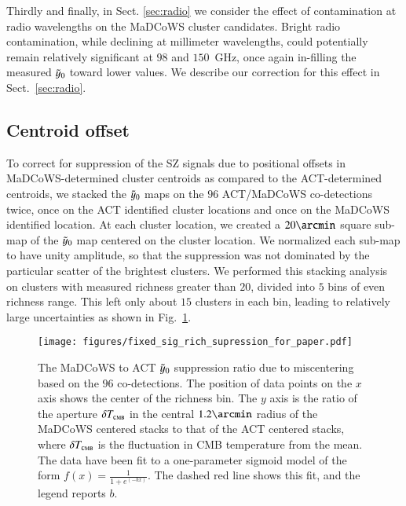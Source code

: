 \documentclass[longauth]{aa} %
\newcommand{\yc}{$\Tilde{\vary}_0$\xspace}
\begin{document}
Thirdly and finally, in Sect. \ref{sec:radio} we consider the effect of contamination at radio wavelengths on the MaDCoWS cluster candidates.  Bright radio contamination, while declining at millimeter wavelengths, could potentially remain relatively significant at $98$ and $150$~GHz,  once again in-filling the measured \yc toward lower values. We describe our correction for this effect in Sect.~\ref{sec:radio}.

\subsection{Centroid offset}\label{sec:miscentering}
 To correct for suppression of the SZ signals due to positional offsets in MaDCoWS-determined cluster centroids as compared to the ACT-determined centroids, we stacked the \yc maps on the $96$ ACT/MaDCoWS co-detections twice, once on the ACT identified cluster locations and once on the MaDCoWS identified location. At each cluster location, we created a $20\arcmin$ square sub-map of the $\Tilde{\vary}_0$ map centered on the cluster location. We normalized each sub-map to have unity amplitude, so that the suppression was not dominated by the particular scatter of the brightest clusters. We performed this stacking analysis on clusters with measured richness greater than $20$, divided into $5$ bins of even richness range. This left only about $15$ clusters in each bin, leading to relatively large uncertainties as shown in Fig.~\ref{fig:scatter_supression}.


\begin{figure}
    \centering
    \texttt{[image: figures/fixed\_sig\_rich\_supression\_for\_paper.pdf]}
    \caption{The MaDCoWS to ACT $\Tilde{\vary}_0$ suppression ratio due to miscentering based on the $96$ co-detections. The position of data points on the $x$ axis shows the center of the richness bin. The $y$ axis is the ratio of the aperture $\delta T_\textsc{cmb}$  in the central $1.2\arcmin$ radius of the MaDCoWS centered stacks to that of the ACT centered stacks, where $\delta T_\textsc{cmb}$ is the fluctuation in CMB temperature from the mean. The data have been fit to a one-parameter sigmoid model of the form $f(x) = \frac{1}{1+e^{(-bx)}} $. The dashed red line shows this fit, and the legend reports $b$.} 
    
    \label{fig:scatter_supression}
\end{figure}
\end{document}
